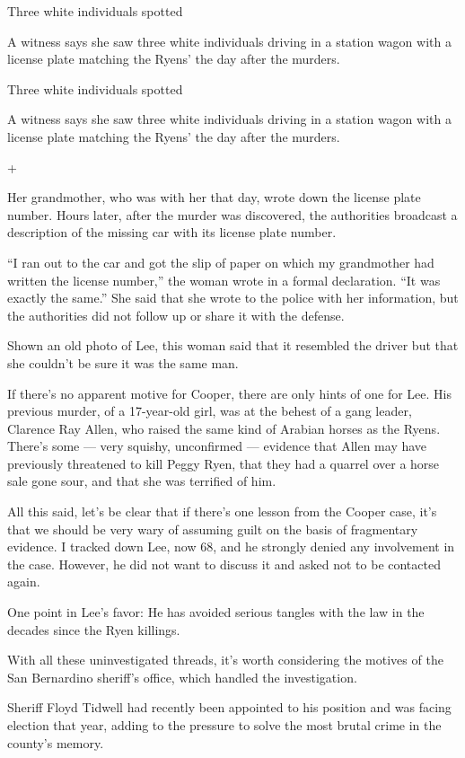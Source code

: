 Three white individuals spotted

A witness says she saw three white individuals driving in a station
wagon with a license plate matching the Ryens' the day after the
murders.

Three white individuals spotted

A witness says she saw three white individuals driving in a station
wagon with a license plate matching the Ryens' the day after the
murders.

+

Her grandmother, who was with her that day, wrote down the license plate
number. Hours later, after the murder was discovered, the authorities
broadcast a description of the missing car with its license plate
number.

``I ran out to the car and got the slip of paper on which my grandmother
had written the license number,'' the woman wrote in a formal
declaration. ``It was exactly the same.'' She said that she wrote to the
police with her information, but the authorities did not follow up or
share it with the defense.

Shown an old photo of Lee, this woman said that it resembled the driver
but that she couldn't be sure it was the same man.

If there's no apparent motive for Cooper, there are only hints of one
for Lee. His previous murder, of a 17-year-old girl, was at the behest
of a gang leader, Clarence Ray Allen, who raised the same kind of
Arabian horses as the Ryens. There's some --- very squishy, unconfirmed
--- evidence that Allen may have previously threatened to kill Peggy
Ryen, that they had a quarrel over a horse sale gone sour, and that she
was terrified of him.

All this said, let's be clear that if there's one lesson from the Cooper
case, it's that we should be very wary of assuming guilt on the basis of
fragmentary evidence. I tracked down Lee, now 68, and he strongly denied
any involvement in the case. However, he did not want to discuss it and
asked not to be contacted again.

One point in Lee's favor: He has avoided serious tangles with the law in
the decades since the Ryen killings.

With all these uninvestigated threads, it's worth considering the
motives of the San Bernardino sheriff's office, which handled the
investigation.

Sheriff Floyd Tidwell had recently been appointed to his position and
was facing election that year, adding to the pressure to solve the most
brutal crime in the county's memory.

